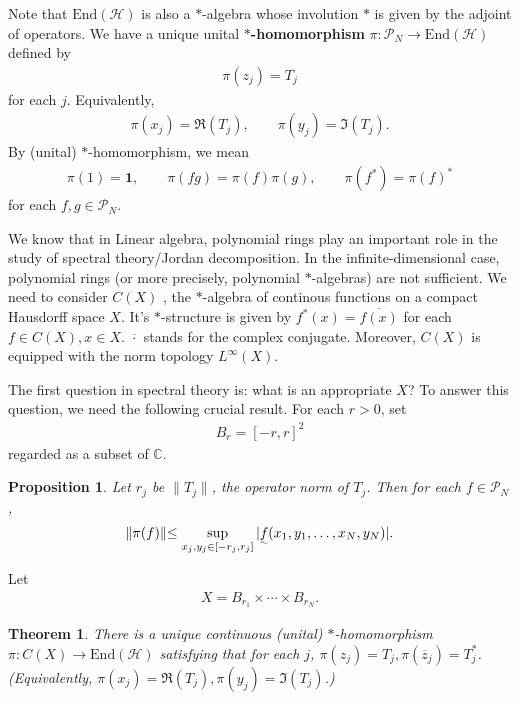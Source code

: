 \documentclass[12pt,a4paper,notitlepage]{article}
\theoremstyle{definition}
\theoremstyle{plain}
\newtheorem{thm}[df]{Theorem}
\newtheorem{pp}[df]{Proposition}
\newcommand{\mc}{\mathcal}
\newcommand{\ovl}{\overline}
\newcommand{\End}{\mathrm{End}} %
\newcommand{\id}{\mathbf{1}}
\newcommand{\Cbb}{\mathbb C}
\numberwithin{equation}{section}
\begin{document}
Note that $\End(\mc H)$ is also a $*$-algebra whose involution $*$ is given by the adjoint of operators. We have a unique unital \textbf{$*$-homomorphism} $\pi:\mc P_N\rightarrow\End(\mc H)$ defined by
\begin{align}
\pi(z_j)=T_j \label{eq1}
\end{align}
for each $j$. Equivalently,
\begin{align*}
\pi (x_j)=\Re(T_j),\qquad \pi(y_j)=\Im(T_j).	
\end{align*}
By (unital) $*$-homomorphism, we mean
\begin{gather}
\pi(1)=\id,\qquad 	\pi(fg)=\pi(f)\pi(g),\qquad \pi(f^*)=\pi(f)^*\label{eq15}
\end{gather}
for each $f,g\in\mc P_N$. 


We know that in Linear algebra, polynomial rings play an important role in the study of spectral theory/Jordan decomposition. In the infinite-dimensional case, polynomial rings (or more precisely, polynomial $*$-algebras) are not sufficient. We need to consider $C(X)$ , the $*$-algebra of continous functions on a compact Hausdorff space $X$. It's $*$-structure is given by $f^*(x)=\ovl{f(x)}$ for each $f\in C(X),x\in X$. $\ovl{\cdot}$ stands for the complex conjugate. Moreover, $C(X)$ is equipped with the norm topology $L^\infty(X)$.


The first question in spectral theory is: what is an appropriate $X$? To answer this question, we need the following crucial result. For each $r>0$, set 
\begin{align}
B_r=[-r,r]^2	
\end{align}
regarded as a subset of $\Cbb$.

\begin{pp}\label{lb1}
Let $r_j$ be $\lVert T_j\lVert$, the operator norm of $T_j$. Then for each $f\in\mc P_N$, 
\begin{align}\label{eq25}
\lVert \pi(f)\lVert\leq \sup_{x_j,y_j\in[-r_j,r_j]}| \uwave f(x_1,y_1,\dots,x_N,y_N)|.	
\end{align}
\end{pp}


Let
\begin{align*}
X=B_{r_1}\times\cdots \times B_{r_N}.
\end{align*}

\begin{thm}\label{lb17}
There is a unique  continuous (unital) $*$-homomorphism $\pi:C(X)\rightarrow\End(\mc H)$ satisfying that for each $j$, $\pi(z_j)=T_j,\pi(\ovl z_j)=T_j^*$. (Equivalently, $\pi(x_j)=\Re(T_j),\pi(y_j)=\Im (T_j)$.)
\end{thm}
\end{document}
